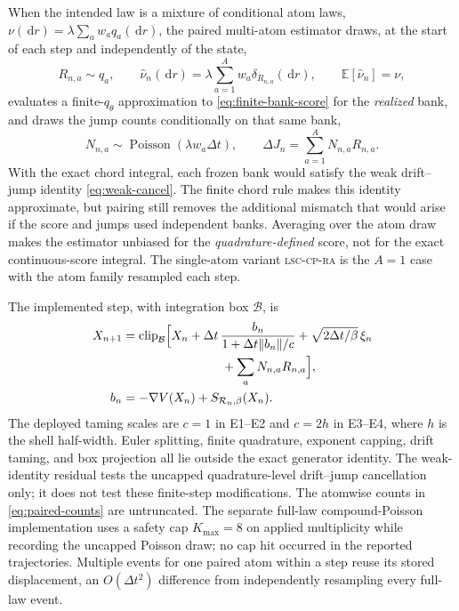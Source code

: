 \documentclass[11pt]{article}
\newcommand{\dd}{\,\mathrm{d}}
\newcommand{\E}{\mathbb{E}}
\begin{document}
When the intended law is a mixture of conditional atom laws,
$\nu(\dd r)=\lambda\sum_aw_aq_a(\dd r)$, the paired multi-atom estimator
draws, at the start of each step and independently of the state,
\begin{equation}
 R_{n,a}\sim q_a,
 \qquad
 \widehat\nu_n(\dd r)=\lambda\sum_{a=1}^{A}w_a\delta_{R_{n,a}}(\dd r),
 \qquad \E[\widehat\nu_n]=\nu ,
\end{equation}
evaluates a finite-$q_\theta$ approximation to
\eqref{eq:finite-bank-score} for the \emph{realized} bank, and draws the
jump counts conditionally on that same bank,
\begin{equation}
 N_{n,a}\sim\operatorname{Poisson}(\lambda w_a\Delta t),
 \qquad
 \Delta J_n=\sum_{a=1}^{A}N_{n,a}R_{n,a}.
 \label{eq:paired-counts}
\end{equation}
With the exact chord integral, each frozen bank would satisfy the weak
drift--jump identity \eqref{eq:weak-cancel}.  The finite chord rule makes this
identity approximate, but pairing still removes the additional mismatch that
would arise if the score and jumps used independent banks.  Averaging over the
atom draw makes the estimator unbiased for the \emph{quadrature-defined}
score, not for the exact continuous-score integral.  The single-atom variant
\textsc{lsc-cp-ra} is the $A=1$ case with the atom family resampled each step.

The implemented step, with integration box $\mathcal B$, is
\begin{equation}
 \begin{aligned}
 X_{n+1}
 &=\operatorname{clip}_{\mathcal B}\Bigl[
 X_n+\Delta t\,\frac{b_n}{1+\Delta t\lVert b_n\rVert/c}
 +\sqrt{2\Delta t/\beta}\,\xi_n\\
 &\hspace{8em}+\sum_aN_{n,a}R_{n,a}\Bigr],\\
 b_n&=-\nabla V(X_n)+S_{\mathcal R_n,\beta}(X_n).
 \end{aligned}
 \label{eq:euler-paired}
\end{equation}
The deployed taming scales are $c=1$ in E1--E2 and $c=2h$ in E3--E4, where
$h$ is the shell half-width.
Euler splitting, finite quadrature, exponent capping, drift taming, and box
projection all lie outside the exact generator identity.  The weak-identity
residual tests the uncapped quadrature-level drift--jump cancellation only; it
does not test these finite-step modifications.  The atomwise counts in
\eqref{eq:paired-counts} are untruncated.  The separate full-law
compound-Poisson implementation uses a safety cap $K_{\max}=8$ on applied
multiplicity while recording the uncapped Poisson draw; no cap hit occurred in
the reported trajectories.  Multiple events for one paired atom within a step
reuse its stored displacement, an $O(\Delta t^2)$ difference from independently
resampling every full-law event.
\end{document}
